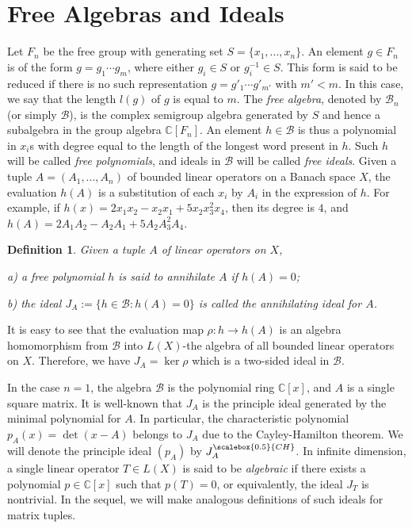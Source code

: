 \documentclass[draft, 12pt, reqno]{amsart}
\newcommand{\C}{{\mathbb C}}
\newcommand{\B}{{\mathcal B}}
\numberwithin{equation}{section}
\theoremstyle{plain}
\newtheorem{definition}[theorem]{Definition}
\begin{document}
\section{Free Algebras and Ideals}\label{free ideals}

Let $F_n$ be the free group with generating set $S=\{x_1, ..., x_n\}$. An element $g\in F_n$ is of the form $g=g_1\cdots g_m$, where either $g_i\in S$ or $g_i^{-1}\in S$. This form is said to be reduced if there is no such representation $g=g'_1\cdots g'_{m'}$ with $m'<m$. In this case, we say that the length $l(g)$ of $g$ is equal to $m$. The {\em free algebra}, denoted by ${\mathcal B}_n$ (or simply $\B$), is the complex semigroup algebra generated by $S$ and hence a subalgebra in the group algebra $\C[F_n]$. An element $h\in \B$ is thus a polynomial in $x_i$s with degree equal to the length of the longest word present in $h$. Such $h$ will be called {\em free polynomials}, and ideals in $\B$ will be called {\em free ideals}. Given a tuple $A=(A_1, ..., A_n)$ of bounded linear operators on a Banach space $X$, the evaluation $h(A)$ is a substitution of each $x_i$ by $A_i$ in the expression of $h$. For example, if $h(x)=2x_1x_2-x_2x_1+5x_2x_3^2x_4$, then its degree is $4$, and $h(A)=2A_1A_2-A_2A_1+5A_2A_3^2A_4$. 
\begin{definition}\label{annihi}
Given a tuple $A$ of linear operators on $X$, 

a) a free polynomial $h$ is said to {\em annihilate} $A$ if $h(A)=0$;

b) the ideal $J_A:=\{h\in \B: h(A)=0\}$ is called the {\em annihilating ideal} for $A$.
\end{definition}
It is easy to see that the evaluation map $\rho: h\to h(A)$ is an algebra homomorphism from $\B$ into $L(X)$-the algebra of all bounded linear operators on $X$. Therefore, we have $J_A=\ker \rho$ which is a two-sided ideal in $\B$.

In the case $n=1$, the algebra $\B$ is the polynomial ring $\C[x]$, and $A$ is a single square matrix. It is well-known that $J_A$ is the principle ideal generated by the minimal polynomial for $A$. In particular, the characteristic polynomial $p_A(x)=\det (x-A)$ belongs to $J_A$ due to the Cayley-Hamilton theorem. We will denote the principle ideal $(p_A)$ by $J_A^{\scalebox{0.5}{CH}}$. In infinite dimension, a single linear operator $T\in L(X)$ is said to be {\em algebraic} if there exists a polynomial $p\in \C[x]$ such that $p(T)=0$, or equivalently, the ideal $J_T$ is nontrivial.  In the sequel, we will make analogous definitions of such ideals for matrix tuples.
\end{document}
